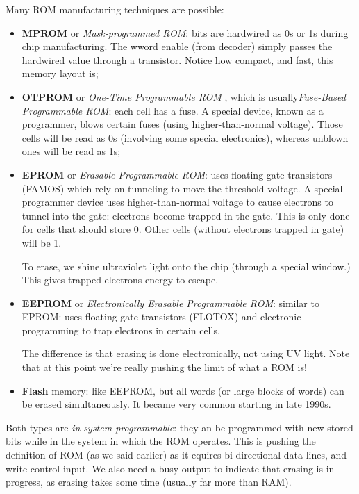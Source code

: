 \documentclass[a4paper,11pt]{article}
\begin{document}
Many ROM manufacturing techniques are possible:
\begin{itemize}
	\item \textbf{MPROM} or \textit{Mask-programmed ROM}: bits are hardwired as 0s or 1s during chip manufacturing. The wword enable (from decoder) simply passes the hardwired value through a transistor. Notice how compact, and fast, this memory layout is;
	\item \textbf{OTPROM} or \textit{One-Time Programmable ROM} , which is usually\textit{Fuse-Based Programmable ROM}: each cell has a fuse. A special device, known as a programmer,
	      blows certain fuses (using higher-than-normal voltage). Those cells will be read as 0s (involving some special electronics), whereas unblown ones will be read as 1s;
	\item \textbf{EPROM} or \textit{Erasable Programmable ROM}: uses floating-gate transistors (FAMOS) which rely on tunneling to move the threshold voltage. A special programmer device uses higher-than-normal voltage to cause electrons to tunnel into the gate: electrons become trapped in the gate.
	      This is only done for cells that should store 0.
	      Other cells (without electrons trapped in gate)
	      will be 1.

	      To erase, we shine ultraviolet light onto the chip (through a special window.)
	      This gives trapped electrons energy to escape.

	\item \textbf{EEPROM} or \textit{Electronically Erasable Programmable ROM}: similar to EPROM: uses floating-gate transistors (FLOTOX) and electronic programming to trap electrons in certain cells.

	      The difference is that erasing is done electronically, not using UV light.
	      Note that at this point we're really pushing the limit of what a ROM is!

	\item \textbf{Flash} memory: like EEPROM, but all words (or large blocks of words) can
	      be erased simultaneously. It became very common starting in late 1990s.
\end{itemize}

Both types are \textit{in-system programmable}: they an be programmed with new stored bits while in the system in which the ROM operates.
This is pushing the definition of ROM (as we said earlier) as it equires bi-directional data lines, and write control input.
We also need a busy output to indicate that erasing is in progress, as erasing takes some time (usually far more than RAM).
\end{document}
